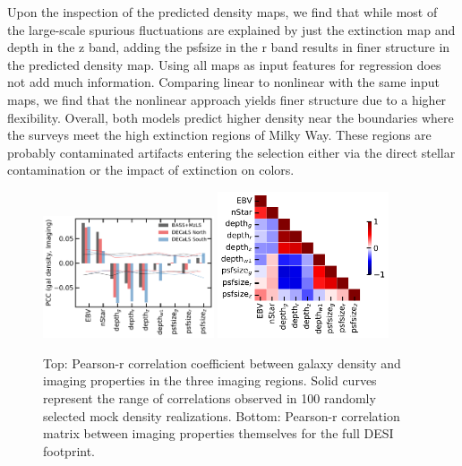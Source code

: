Upon the inspection of the predicted density maps, we find that while most of the large-scale spurious fluctuations are explained by just the extinction map and depth in the z band, adding the psfsize in the r band results in finer structure in the predicted density map. Using all maps as input features for regression does not add much information. Comparing linear to nonlinear with the same input maps, we find that the nonlinear approach yields finer structure due to a higher flexibility.  Overall, both models predict higher density near the boundaries where the surveys meet the high extinction regions of Milky Way. These regions are probably contaminated artifacts entering the selection either via the direct stellar contamination or the impact of extinction on colors.


\begin{figure}
    \includegraphics[width=0.45\textwidth]{figures/pcc.pdf} 
    \includegraphics[width=0.45\textwidth]{figures/pccx.pdf}     
    \caption{Top: Pearson-r correlation coefficient between galaxy density and imaging properties in the three imaging regions. Solid curves represent the range of correlations observed in 100 randomly selected mock density realizations. Bottom: Pearson-r correlation matrix between imaging properties themselves for the full DESI footprint.}
    \label{fig:pcc}
\end{figure}


